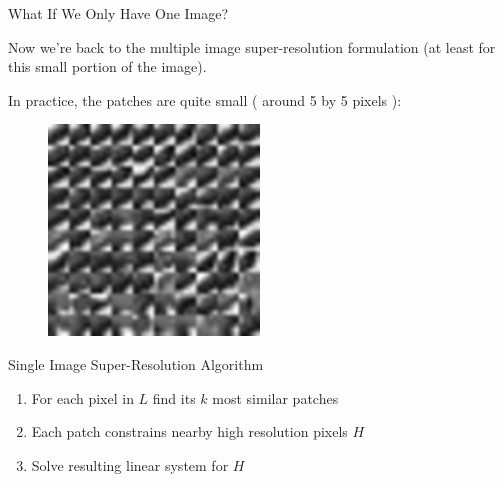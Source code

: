 \documentclass{beamer}
\begin{document}

\begin{frame}{What If We Only Have One Image?}

Now we're back to the multiple image super-resolution formulation (at least for this small portion of the image).

\vspace{0.3cm}

In practice, the patches are quite small ( around 5 by 5 pixels ):

\begin{figure}
\centering
\includegraphics[width=0.5\textwidth]{similar_patches_1.png}
\end{figure}

\end{frame}


\begin{frame}{Single Image Super-Resolution Algorithm}

\begin{enumerate}
\item For each pixel in \(L\) find its \(k\) most similar patches
\item Each patch constrains nearby high resolution pixels \(H\)
\item Solve resulting linear system for \(H\)
\end{enumerate}

\end{frame}

\end{document}
